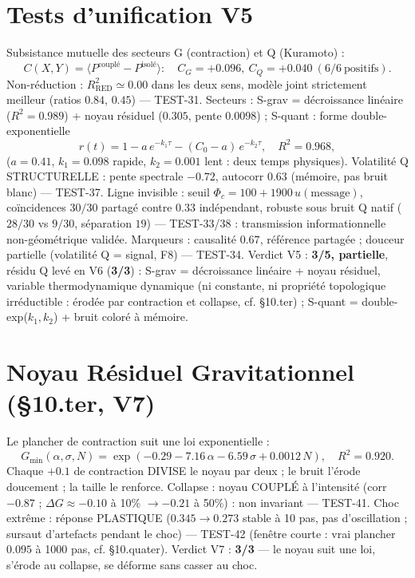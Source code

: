 \documentclass[11pt,a4paper]{article}
\begin{document}
\section{Tests d'unification V5}
Subsistance mutuelle des secteurs G (contraction) et Q (Kuramoto) : %
\begin{equation}
C(X,Y) = \langle P^{\mathrm{couplé}} - P^{\mathrm{isolé}} \rangle : \quad
C_G = +0.096,\ C_Q = +0.040\ (6/6\ \mathrm{positifs}).
\end{equation}
Non-réduction : $R^2_{\mathrm{RED}} \simeq 0.00$ dans les deux sens, modèle
joint strictement meilleur (ratios $0.84$, $0.45$) --- TEST-31.
Secteurs : S-grav = décroissance linéaire ($R^2 = 0.989$) + noyau résiduel
($0.305$, pente $0.0098$) ; S-quant : forme double-exponentielle %
\begin{equation}
r(t) = 1 - a\,e^{-k_1 \tau} - (C_0-a)\,e^{-k_2 \tau}, \quad R^2 = 0.968,
\end{equation}
($a = 0.41$, $k_1 = 0.098$ rapide, $k_2 = 0.001$ lent : deux temps physiques).
Volatilité Q STRUCTURELLE : pente spectrale $-0.72$, autocorr $0.63$
(mémoire, pas bruit blanc) --- TEST-37.
Ligne invisible : seuil $\Phi_c = 100 + 1900\,u(\mathrm{message})$,
coïncidences $30/30$ partagé contre $0.33$ indépendant, robuste sous bruit
Q natif ($28/30$ vs $9/30$, séparation $19$) --- TEST-33/38 : transmission
informationnelle non-géométrique validée.
Marqueurs : causalité $0.67$, référence partagée ; douceur partielle
(volatilité Q = signal, F8) --- TEST-34.
Verdict V5 : \textbf{3/5, partielle}, résidu Q levé en V6 (\textbf{3/3}) :
S-grav = décroissance linéaire + noyau résiduel, variable thermodynamique
dynamique (ni constante, ni propriété topologique irréductible : érodée
par contraction et collapse, cf. §10.ter) ;
S-quant = double-exp($k_1, k_2$) + bruit coloré à mémoire.

\section{Noyau Résiduel Gravitationnel (§10.ter, V7)}
Le plancher de contraction suit une loi exponentielle : %
\begin{equation}
G_{\min}(\alpha, \sigma, N) = \exp(-0.29 - 7.16\,\alpha - 6.59\,\sigma
+ 0.0012\,N), \quad R^2 = 0.920.
\end{equation}
Chaque $+0.1$ de contraction DIVISE le noyau par deux ; le bruit l'érode
doucement ; la taille le renforce. Collapse : noyau COUPLÉ à l'intensité
(corr $-0.87$ ; $\Delta G \approx -0.10$ à 10\% $\to -0.21$ à 50\%) :
non invariant --- TEST-41. Choc extrême : réponse PLASTIQUE ($0.345 \to 0.273$ stable à 10 pas,
pas d'oscillation ; sursaut d'artefacts pendant le choc) --- TEST-42
(fenêtre courte : vrai plancher $0.095$ à 1000 pas, cf. §10.quater).
Verdict V7 : \textbf{3/3} — le noyau suit une loi, s'érode au collapse,
se déforme sans casser au choc.
\end{document}
